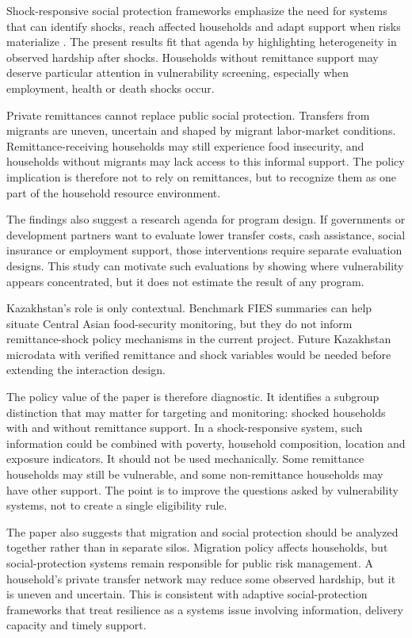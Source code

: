 \documentclass[11pt]{article}
\begin{document}
Shock-responsive social protection frameworks emphasize the need for systems that can identify shocks, reach affected households and adapt support when risks materialize \parencite{OBrien2018,Bowen2020}. The present results fit that agenda by highlighting heterogeneity in observed hardship after shocks. Households without remittance support may deserve particular attention in vulnerability screening, especially when employment, health or death shocks occur.

Private remittances cannot replace public social protection. Transfers from migrants are uneven, uncertain and shaped by migrant labor-market conditions. Remittance-receiving households may still experience food insecurity, and households without migrants may lack access to this informal support. The policy implication is therefore not to rely on remittances, but to recognize them as one part of the household resource environment.

The findings also suggest a research agenda for program design. If governments or development partners want to evaluate lower transfer costs, cash assistance, social insurance or employment support, those interventions require separate evaluation designs. This study can motivate such evaluations by showing where vulnerability appears concentrated, but it does not estimate the result of any program.

Kazakhstan's role is only contextual. Benchmark FIES summaries can help situate Central Asian food-security monitoring, but they do not inform remittance-shock policy mechanisms in the current project. Future Kazakhstan microdata with verified remittance and shock variables would be needed before extending the interaction design.

The policy value of the paper is therefore diagnostic. It identifies a subgroup distinction that may matter for targeting and monitoring: shocked households with and without remittance support. In a shock-responsive system, such information could be combined with poverty, household composition, location and exposure indicators. It should not be used mechanically. Some remittance households may still be vulnerable, and some non-remittance households may have other support. The point is to improve the questions asked by vulnerability systems, not to create a single eligibility rule.

The paper also suggests that migration and social protection should be analyzed together rather than in separate silos. Migration policy affects households, but social-protection systems remain responsible for public risk management. A household's private transfer network may reduce some observed hardship, but it is uneven and uncertain. This is consistent with adaptive social-protection frameworks that treat resilience as a systems issue involving information, delivery capacity and timely support.
\end{document}

